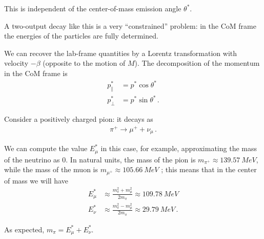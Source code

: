 \documentclass[main.tex]{subfiles}
\begin{document}
This is independent of the center-of-mass emission angle \(\theta^{*}\). 

A two-output decay like this is a very ``constrained'' problem: in the CoM frame the energies of the particles are fully determined.

We can recover the lab-frame quantities by a Lorentz transformation with velocity \(-\beta \) (opposite to the motion of \(M\)). 
The decomposition of the momentum in the CoM frame is 
%
\begin{align}
p^{*}_{\parallel} &= p^{*} \cos \theta^{*} \\
p^{*}_{\perp} &= p^{*} \sin \theta^{*}
\,.
\end{align}

Consider a positively charged pion: it decays as 
%
\begin{align}
\pi^{+} \to \mu^{+} + \nu_{\mu}
\,.
\end{align}

We can compute the value \(E^{*}_{\mu }\) in this case, for example, approximating the mass of the neutrino as 0. 
In natural units, the mass of the pion is \(m_{\pi^{+}} \approx \SI{139.57}{MeV}\), while the mass of the muon is \(m_{\mu^{+}} \approx \SI{105.66}{MeV}\) \cite{groupReviewParticlePhysics2020}; this means that in the center of mass we will have 
%
\begin{align}
E_{\mu }^{*} &\approx \frac{m_\pi^2 + m_\mu^2}{2 m_\pi } \approx \SI{109.78}{MeV}  \\
E_\nu^{*} &\approx \frac{m_\pi^2 - m_\mu^2}{2 m_\pi} \approx \SI{29.79}{MeV}
\,.
\end{align}

As expected, \(m_\pi = E_\mu^{*} +E_\nu^{*} \). 
\end{document}
